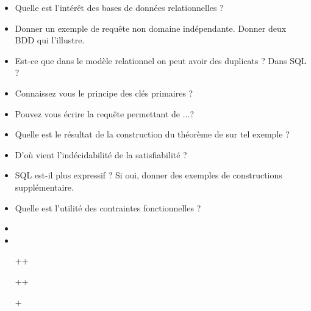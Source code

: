 \documentclass{agregfiche}
\begin{document}
\secquestionsclassiques

\begin{itemize}
    \item Quelle est l'intérêt des bases de données relationnelles ?
    \item Donner un exemple de requête non domaine indépendante.
	Donner deux BDD qui l'illustre.
    \item Est-ce que dans le modèle relationnel on peut avoir des
    duplicats ? Dans SQL ?
    \item Connaissez vous le principe des clés primaires ?
    \item Pouvez vous écrire la requête permettant de ...?
    \item Quelle est le résultat de la construction du théorème de
     sur tel exemple ?
    \item D'où vient l'indécidabilité de la satisfiabilité ?
    \item SQL est-il plus expressif ? Si oui, donner des exemples de
    constructions supplémentaire.
    \item Quelle est l'utilité des contraintes fonctionnelles ?
\end{itemize}

\secreferences

\begin{itemize}
\item 
\item 
\end{itemize}

\secdev

\begin{itemize}
\item[++] 
\item[++] 
\item[+] 
\end{itemize}
\end{document}
